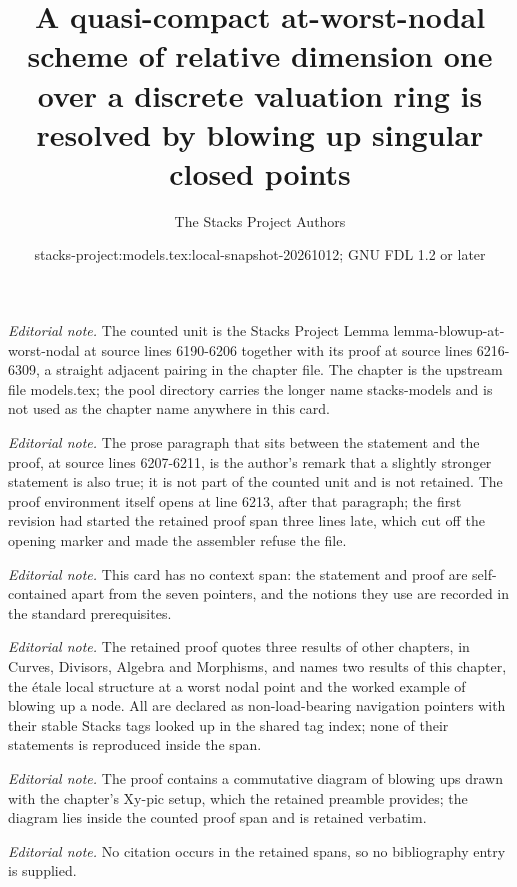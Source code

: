 \documentclass[10pt,a4paper]{amsart}
\title{A quasi-compact at-worst-nodal scheme of relative dimension one over a discrete valuation ring is resolved by blowing up singular closed points}
\author{The Stacks Project Authors}
\date{stacks-project:models.tex:local-snapshot-20261012; GNU FDL 1.2 or later}
\theoremstyle{plain}
\theoremstyle{definition}
\theoremstyle{remark}
\numberwithin{equation}{subsection}
\begin{document}
\maketitle
\noindent\textit{Editorial note.} The counted unit is the Stacks Project Lemma lemma-blowup-at-worst-nodal at source lines 6190-6206 together with its proof at source lines 6216-6309, a straight adjacent pairing in the chapter file. The chapter is the upstream file models.tex; the pool directory carries the longer name stacks-models and is not used as the chapter name anywhere in this card.\par\medskip
\noindent\textit{Editorial note.} The prose paragraph that sits between the statement and the proof, at source lines 6207-6211, is the author's remark that a slightly stronger statement is also true; it is not part of the counted unit and is not retained. The proof environment itself opens at line 6213, after that paragraph; the first revision had started the retained proof span three lines late, which cut off the opening marker and made the assembler refuse the file.\par\medskip
\noindent\textit{Editorial note.} This card has no context span: the statement and proof are self-contained apart from the seven pointers, and the notions they use are recorded in the standard prerequisites.\par\medskip
\noindent\textit{Editorial note.} The retained proof quotes three results of other chapters, in Curves, Divisors, Algebra and Morphisms, and names two results of this chapter, the étale local structure at a worst nodal point and the worked example of blowing up a node. All are declared as non-load-bearing navigation pointers with their stable Stacks tags looked up in the shared tag index; none of their statements is reproduced inside the span.\par\medskip
\noindent\textit{Editorial note.} The proof contains a commutative diagram of blowing ups drawn with the chapter's Xy-pic setup, which the retained preamble provides; the diagram lies inside the counted proof span and is retained verbatim.\par\medskip
\noindent\textit{Editorial note.} No citation occurs in the retained spans, so no bibliography entry is supplied.\par\medskip
\end{document}
